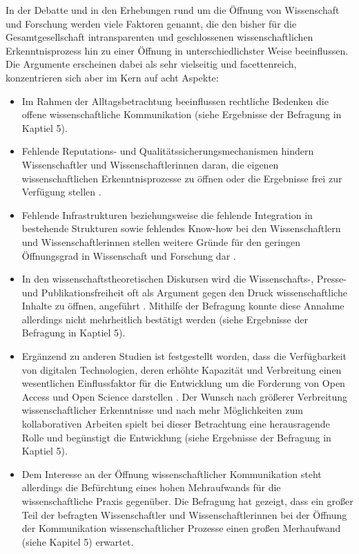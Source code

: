 In der Debatte und in den Erhebungen rund um die Öffnung von Wissenschaft und Forschung werden viele Faktoren genannt, die den bisher für die Gesamtgesellschaft intransparenten und geschlossenen wissenschaftlichen Erkenntnisprozess hin zu einer Öffnung in unterschiedlichster Weise beeinflussen. Die Argumente erscheinen dabei als sehr vielseitig und facettenreich, konzentrieren sich aber im Kern auf acht Aspekte:

\begin{itemize}
\item Im Rahmen der Alltagsbetrachtung beeinflussen rechtliche Bedenken die offene wissenschaftliche Kommunikation (siehe Ergebnisse der Befragung in Kaptiel 5).
\item Fehlende Reputations- und Qualitätssicherungsmechanismen hindern Wissenschaftler und Wissenschaftlerinnen daran, die eigenen wissenschaftlichen Erkenntnisprozesse zu öffnen oder die Ergebnisse frei zur Verfügung stellen \cite{herb_2015}.
\item Fehlende Infrastrukturen beziehungsweise die fehlende Integration in bestehende Strukturen sowie fehlendes Know-how bei den Wissenschaftlern und Wissenschaftlerinnen stellen weitere Gründe für den geringen Öffnungsgrad in Wissenschaft und Forschung dar \cite{European_Commission_2015b}.
\item In den wissenschaftstheoretischen Diskursen wird die Wissenschafts-, Presse- und Publikationsfreiheit oft als Argument gegen den Druck wissenschaftliche Inhalte zu öffnen, angeführt \cite{Fehling_2014}. Mithilfe der Befragung konnte diese Annahme allerdings nicht mehrheitlich bestätigt werden (siehe Ergebnisse der Befragung in Kaptiel 5).
\item Ergänzend zu anderen Studien ist festgestellt worden, dass die Verfügbarkeit von digitalen Technologien, deren erhöhte Kapazität und Verbreitung einen wesentlichen Einflussfaktor für die Entwicklung um die Forderung von Open Access und Open Science darstellen \cite{European_Commission_2015b}. Der Wunsch nach größerer Verbreitung wissenschaftlicher Erkenntnisse und nach mehr Möglichkeiten zum kollaborativen Arbeiten spielt bei dieser Betrachtung eine herausragende Rolle und begünstigt die Entwicklung (siehe Ergebnisse der Befragung in Kaptiel 5).
\item Dem Interesse an der Öffnung wissenschaftlicher Kommunikation steht allerdings die Befürchtung eines hohen Mehraufwands für die wissenschaftliche Praxis gegenüber. Die Befragung hat gezeigt, dass ein großer Teil der befragten Wissenschaftler und Wissenschaftlerinnen bei der Öffnung der Kommunikation wissenschaftlicher Prozesse einen großen Merhaufwand (siehe Kapitel 5) erwartet.

\end{itemize}
